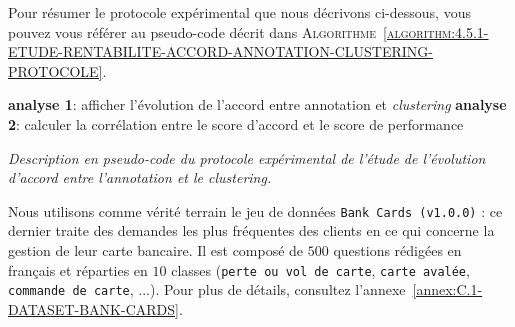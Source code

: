 			Pour résumer le protocole expérimental que nous décrivons ci-dessous, vous pouvez vous référer au pseudo-code décrit dans \textsc{Algorithme~\ref{algorithm:4.5.1-ETUDE-RENTABILITE-ACCORD-ANNOTATION-CLUSTERING-PROTOCOLE}}.
			
			\begin{algorithm}
				\textbf{analyse 1}: afficher l'évolution de l'accord entre annotation et \textit{clustering} \;
				\textbf{analyse 2}: calculer la corrélation entre le score d'accord et le score de performance \;
				\caption{\textit{Description en pseudo-code du protocole expérimental de l'étude de l'évolution d'accord entre l'annotation et le \textit{clustering}.}}
				\label{algorithm:4.5.1-ETUDE-RENTABILITE-ACCORD-ANNOTATION-CLUSTERING-PROTOCOLE}
			\end{algorithm}
			
			Nous utilisons comme vérité terrain le jeu de données \texttt{Bank Cards (v1.0.0)} : ce dernier traite des demandes les plus fréquentes des clients en ce qui concerne la gestion de leur carte bancaire.
			Il est composé de $500$ questions rédigées en français et réparties en $10$ classes (\texttt{perte ou vol de carte}, \texttt{carte avalée}, \texttt{commande de carte}, ...).
			Pour plus de détails, consultez l'annexe~\ref{annex:C.1-DATASET-BANK-CARDS}.
			
